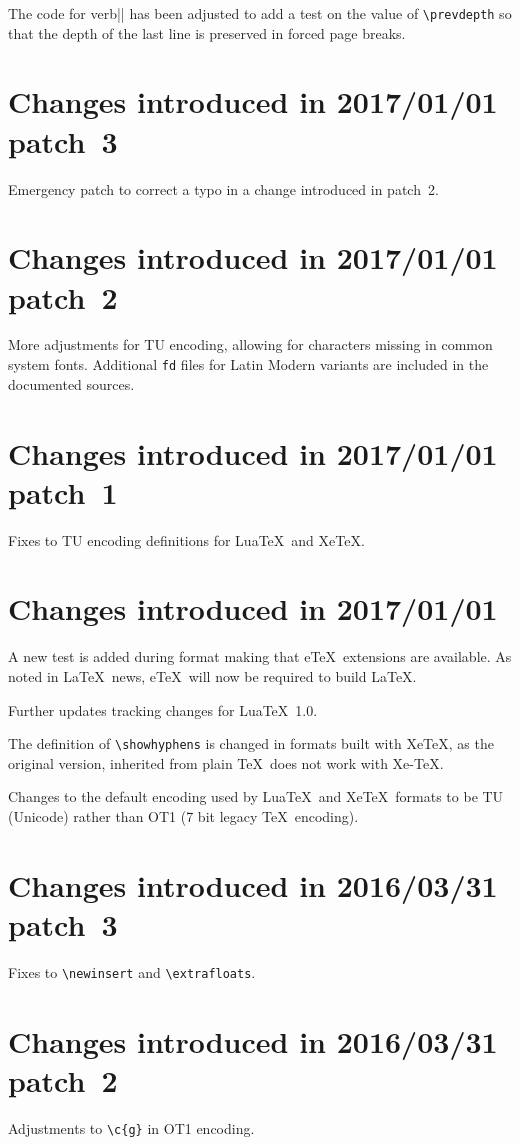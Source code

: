 \documentclass{ltxguide}
\begin{document}
 The code for verb|\newpage| has been adjusted to add a test on the value of
\verb|\prevdepth| so that the depth of the last line is preserved in
forced page breaks.

\section{Changes  introduced in 2017/01/01 patch~3}
Emergency patch to correct a typo in a change introduced in patch~2.

\section{Changes  introduced in 2017/01/01 patch~2}
More adjustments for TU encoding, allowing for characters missing in
common system fonts. Additional \texttt{fd} files
for Latin Modern variants are included in the documented sources.

\section{Changes  introduced in 2017/01/01 patch~1}
Fixes to TU encoding definitions for Lua\TeX\ and Xe\TeX.

\section{Changes  introduced in 2017/01/01}

A new test is added during format making that e\TeX\ extensions are
available. As noted in \LaTeX\ news, e\TeX\ will now be required to
build \LaTeX.
 
Further updates tracking changes for Lua\TeX~1.0.

The definition of \verb|\showhyphens| is changed in formats built
with Xe\TeX, as the original version, inherited from plain \TeX\ does
not work with Xe-\TeX.

Changes to the default encoding used by Lua\TeX\ and Xe\TeX\ formats to
be TU (Unicode) rather than OT1 (7 bit legacy \TeX\ encoding).

\section{Changes  introduced in 2016/03/31 patch~3}
Fixes to \verb|\newinsert| and \verb|\extrafloats|.

\section{Changes  introduced in 2016/03/31 patch~2}
Adjustments to \verb|\c{g}| in OT1 encoding.
\end{document}
